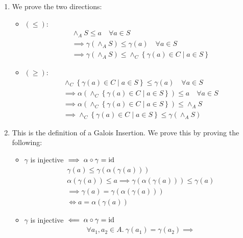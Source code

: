 \begin{exercise}
\begin{enumerate}[(1)]
        \item We prove the two directions:
        \begin{itemize}
            \item $(\leq)$:
            \begin{gather*}
                \wedge_A S \leq a \quad \forall a \in S \\
                \implies \gamma(\wedge_A S) \leq \gamma(a) \quad \forall a \in S \\
                \implies \gamma(\wedge_A S) \leq \wedge_C \left\{\gamma(a) \in C \mid a \in S\right\}
            \end{gather*}
            \item $(\geq)$:
            \begin{gather*}
                \wedge_C \left\{\gamma(a) \in C \mid a \in S\right\} \leq \gamma(a) \quad \forall a \in S \\
                \implies \alpha(\wedge_C \left\{\gamma(a) \in C \mid a \in S\right\}) \leq a \quad \forall a \in S \\
                \implies \alpha(\wedge_C \left\{\gamma(a) \in C \mid a \in S\right\}) \leq \wedge_A S \\
                \implies \wedge_C \left\{\gamma(a) \in C \mid a \in S\right\} \leq \gamma(\wedge_A S)
            \end{gather*}
        \end{itemize}
        \item This is the definition of a Galois Insertion. We prove this by proving the following:
        \begin{itemize}
            \item $\gamma$ is injective $\implies \alpha \circ \gamma = \operatorname{id}$
            \begin{gather*}
                \gamma(a) \leq \gamma(\alpha(\gamma(a))) \\
                \alpha(\gamma(a)) \leq a
                \implies \gamma(\alpha(\gamma(a))) \leq \gamma(a) \\
                \implies \gamma(a) = \gamma(\alpha(\gamma(a))) \\
                \iff a = \alpha(\gamma(a))
            \end{gather*}
            \item $\gamma$ is injective $\impliedby \alpha \circ \gamma = \operatorname{id}$
            \begin{gather*}
                \forall a_1, a_2 \in A.\ \gamma(a_1) = \gamma(a_2) \implies \\

\end{gather*}
\end{itemize}
\end{enumerate}
\end{exercise}
